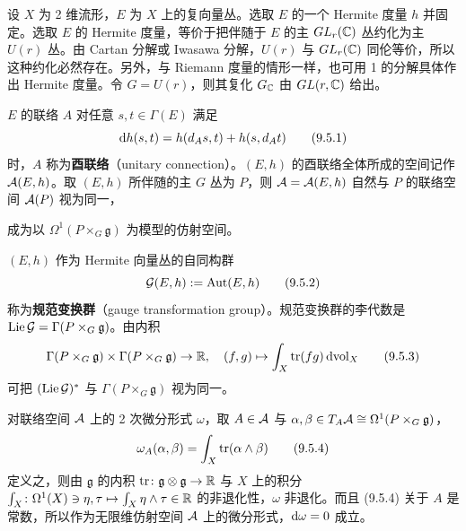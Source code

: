 设 $X$ 为 2 维流形，$E$ 为 $X$ 上的复向量丛。选取 $E$ 的一个 Hermite 度量 $h$ 并固定。选取 $E$ 的 Hermite 度量，等价于把伴随于 $E$ 的主 $GL_r(\mathbb{C})$ 丛约化为主 $U(r)$ 丛。由 Cartan 分解或 Iwasawa 分解，$U(r)$ 与 $GL_r(\mathbb{C})$ 同伦等价，所以这种约化必然存在。另外，与 Riemann 度量的情形一样，也可用 1 的分解具体作出 Hermite 度量。令 $G=U(r)$，则其复化 $G_{\mathbb{C}}$ 由 $GL(r,\mathbb{C})$ 给出。

$E$ 的联络 $A$ 对任意 $s,t\in\Gamma(E)$ 满足
\begin{equation}
  \mathrm{d} h(s,t) = h(d_A s, t) + h(s, d_A t)
  \tag{9.5.1}
\end{equation}
时，$A$ 称为\textbf{酉联络}（unitary connection）。$(E,h)$ 的酉联络全体所成的空间记作 $\mathcal{A}(E,h)$。取 $(E,h)$ 所伴随的主 $G$ 丛为 $P$，则 $\mathcal{A}=\mathcal{A}(E,h)$ 自然与 $P$ 的联络空间 $\mathcal{A}(P)$ 视为同一，

成为以 $\Omega^1(P\times_G\mathfrak{g})$ 为模型的仿射空间。

$(E,h)$ 作为 Hermite 向量丛的自同构群
\begin{equation}
  \mathcal{G}(E,h) := \operatorname{Aut}(E,h)
  \tag{9.5.2}
\end{equation}
称为\textbf{规范变换群}（gauge transformation group）。规范变换群的李代数是 $\operatorname{Lie}\mathcal{G} = \Gamma(P\times_G\mathfrak{g})$。由内积
\begin{equation}
  \Gamma(P\times_G\mathfrak{g})\times\Gamma(P\times_G\mathfrak{g})\to\mathbb{R},\quad
  (f,g)\mapsto \int_X \operatorname{tr}(fg)\, \mathrm{d}\mathrm{vol}_X
  \tag{9.5.3}
\end{equation}
可把 $(\operatorname{Lie}\mathcal{G})^*$ 与 $\Gamma(P\times_G\mathfrak{g})$ 视为同一。

对联络空间 $\mathcal{A}$ 上的 2 次微分形式 $\omega$，取 $A\in\mathcal{A}$ 与 $\alpha,\beta\in T_A\mathcal{A}\cong\Omega^1(P\times_G\mathfrak{g})$，
\begin{equation}
  \omega_A(\alpha,\beta) = \int_X \operatorname{tr}(\alpha\wedge\beta)
  \tag{9.5.4}
\end{equation}
定义之，则由 $\mathfrak{g}$ 的内积 $\operatorname{tr}\colon \mathfrak{g}\otimes\mathfrak{g}\to\mathbb{R}$ 与 $X$ 上的积分 $\int_X\colon \Omega^1(X)\ni\eta,\tau\mapsto \int_X \eta\wedge\tau\in\mathbb{R}$ 的非退化性，$\omega$ 非退化。而且 (9.5.4) 关于 $A$ 是常数，所以作为无限维仿射空间 $\mathcal{A}$ 上的微分形式，$\mathrm{d}\omega=0$ 成立。

